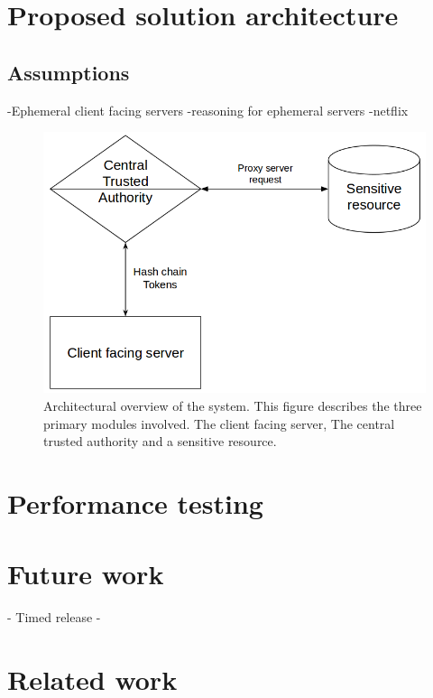 \documentclass[12pt,conference]{IEEEtran}
\begin{document}
\section*{Proposed solution architecture}

\subsection*{Assumptions}
-Ephemeral client facing servers
-reasoning for ephemeral servers
-netflix \cite{basiri_chaos_2016} 


\begin{figure}[hbtp]
\includegraphics[scale=0.3]{overview_architecture.png}
\caption{Architectural overview of the system. This figure describes the three primary modules involved. The client facing server, The central trusted authority and a sensitive resource.}
\end{figure}



\section*{Performance testing}
\section*{Future work}

- Timed release \cite{chalkias_timed_2006}
- 

\section*{Related work}





\end{document}
